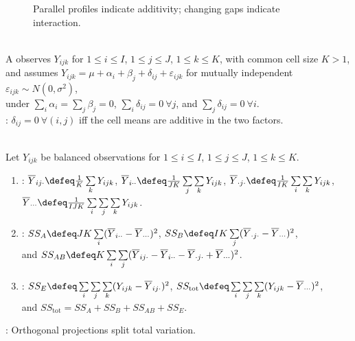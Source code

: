\begin{figure}[H]
  \centering
  
  \caption{Parallel profiles indicate additivity; changing gaps indicate interaction.}
  \label{fig:anova-interaction-parallelism}
\end{figure}

\begin{definition} \label{def:balanced-two-way-normal-model} \\
A  observes $Y_{ijk}$ for $1\leq i\leq I$, $1\leq j\leq J$, $1\leq k\leq K$, with common cell size $K>1$, and assumes $Y_{ijk}=\mu+\alpha_i+\beta_j+\delta_{ij}+\varepsilon_{ijk}$ for mutually independent $\varepsilon_{ijk}\sim N(0,\sigma^2)$,\\
under $\sum\limits_i\alpha_i=\sum\limits_j\beta_j=0$, $\sum\limits_i\delta_{ij}=0\ \forall j$, and $\sum\limits_j\delta_{ij}=0\ \forall i$.\\
: $\delta_{ij}=0\ \forall(i,j)$ iff the cell means are additive in the two factors.
\end{definition}

\begin{definition} \label{def:two-way-anova-sums-of-squares} \\
Let $Y_{ijk}$ be balanced observations for $1\leq i\leq I$, $1\leq j\leq J$, $1\leq k\leq K$.
\begin{enumerate}[label=(\roman*)]
\setlength{\itemsep}{0pt}
\item {}: $\overline{Y}_{ij\cdot}\defeq \frac{1}{K}\sum\limits_kY_{ijk}$, $\overline{Y}_{i\cdot\cdot}\defeq \frac{1}{JK}\sum\limits_j\sum\limits_kY_{ijk}$, $\overline{Y}_{\cdot j\cdot}\defeq \frac{1}{IK}\sum\limits_i\sum\limits_kY_{ijk}$, $\overline{Y}_{\cdot\cdot\cdot}\defeq \frac{1}{IJK}\sum\limits_i\sum\limits_j\sum\limits_kY_{ijk}$.
\item {}: $SS_A\defeq JK\sum\limits_i(\overline{Y}_{i\cdot\cdot}-\overline{Y}_{\cdot\cdot\cdot})^2$, $SS_B\defeq IK\sum\limits_j(\overline{Y}_{\cdot j\cdot}-\overline{Y}_{\cdot\cdot\cdot})^2$,\\
and $SS_{AB}\defeq K\sum\limits_i\sum\limits_j(\overline{Y}_{ij\cdot}-\overline{Y}_{i\cdot\cdot}-\overline{Y}_{\cdot j\cdot}+\overline{Y}_{\cdot\cdot\cdot})^2$.
\item {}: $SS_E\defeq \sum\limits_i\sum\limits_j\sum\limits_k(Y_{ijk}-\overline{Y}_{ij\cdot})^2$, $SS_{\mathrm{tot}}\defeq \sum\limits_i\sum\limits_j\sum\limits_k(Y_{ijk}-\overline{Y}_{\cdot\cdot\cdot})^2$,\\
and $SS_{\mathrm{tot}}=SS_A+SS_B+SS_{AB}+SS_E$.
\end{enumerate}
: Orthogonal projections split total variation.
\end{definition}

